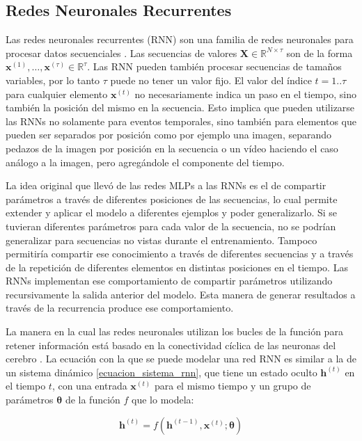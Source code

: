 \documentclass[spanish]{article}
\theoremstyle{definition}
\theoremstyle{remark}
\numberwithin{equation}{section}
\numberwithin{equation}{section} %
\begin{document}
\subsection{Redes Neuronales Recurrentes}
\label{ssec:RNN}
Las redes neuronales recurrentes (RNN) son una familia de redes neuronales para procesar datos secuenciales \cite{goodfellow2016deep,rumelhart1988learning}. Las secuencias de valores $\boldsymbol{X} \in \mathbb{R}^{N\times\tau}$ son de la forma $\boldsymbol{x}^{(1)},\ldots,\boldsymbol{x}^{(\tau)} \in \mathbb{R}^{\tau}$. Las RNN pueden también procesar secuencias de tamaños variables, por lo tanto $\tau$ puede no tener un valor fijo. El valor del índice $t=1..\tau$ para cualquier elemento $\boldsymbol{x}^{(t)}$ no necesariamente indica un paso en el tiempo, sino también la posición del mismo en la secuencia. Esto implica que pueden utilizarse las RNNs no solamente para eventos temporales, sino también para elementos que pueden ser separados por posición como por ejemplo una imagen, separando pedazos de la imagen por posición en la secuencia o un vídeo haciendo el caso análogo a la imagen, pero agregándole el componente del tiempo. \par 
La idea original que llevó de las redes MLPs a las RNNs es el de compartir parámetros a través de diferentes posiciones de las secuencias, lo cual permite extender y aplicar el modelo a diferentes ejemplos y poder generalizarlo. Si se tuvieran diferentes parámetros para cada valor de la secuencia, no se podrían generalizar para secuencias no vistas durante el entrenamiento. Tampoco permitiría compartir ese conocimiento a través de diferentes secuencias y a través de la repetición de diferentes elementos en distintas posiciones en el tiempo.
Las RNNs implementan ese comportamiento de compartir parámetros utilizando recursivamente la salida anterior del modelo. Esta manera de generar resultados a través de la recurrencia produce ese comportamiento.  \par
La manera en la cual las redes neuronales utilizan los bucles de la función para retener información está basado en la conectividad cíclica de las neuronas del cerebro \cite{graves2012supervised}. La ecuación con la que se puede modelar una red RNN es similar a la de un sistema dinámico \eqref{ecuacion_sistema_rnn}, que tiene un estado oculto $\boldsymbol{h}^{(t)}$ en el tiempo $t$, con una entrada $\boldsymbol{x}^{(t)}$ para el mismo tiempo y un grupo de parámetros $\boldsymbol{\theta}$ de la función $f$ que lo modela:\par
\begin{equation}
\label{ecuacion_sistema_rnn}
\boldsymbol{h}^{(t)}=f(\boldsymbol{h}^{(t-1)},\boldsymbol{x}^{(t)};\boldsymbol{\theta})
\end{equation} \par
\end{document}

